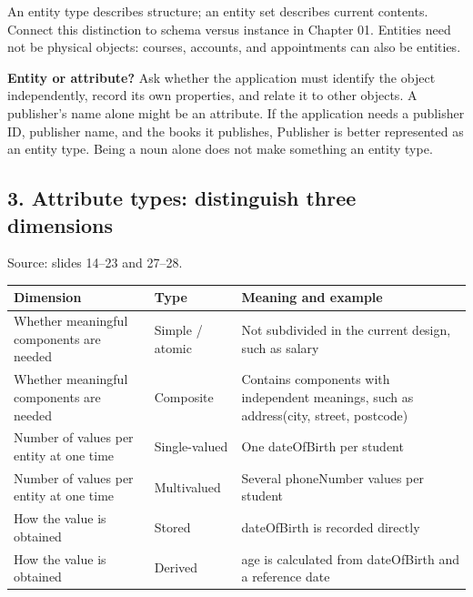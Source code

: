 An entity type describes structure; an entity set describes current contents. Connect this distinction to schema versus instance in Chapter 01. Entities need not be physical objects: courses, accounts, and appointments can also be entities.

\textbf{Entity or attribute?} Ask whether the application must identify the object independently, record its own properties, and relate it to other objects. A publisher's name alone might be an attribute. If the application needs a publisher ID, publisher name, and the books it publishes, Publisher is better represented as an entity type. Being a noun alone does not make something an entity type.

\subsection{3. Attribute types: distinguish three dimensions}\label{02_er_modelling_en-attribute-types-distinguish-three-dimensions}

Source: slides 14--23 and 27--28.

\begin{longtable}[]{@{}
  >{\raggedright\arraybackslash}p{}
  >{\raggedright\arraybackslash}p{}
  >{\raggedright\arraybackslash}p{}@{}}
\toprule\noalign{}
\begin{minipage}[b]{\linewidth}\raggedright
Dimension
\end{minipage} & \begin{minipage}[b]{\linewidth}\raggedright
Type
\end{minipage} & \begin{minipage}[b]{\linewidth}\raggedright
Meaning and example
\end{minipage} \\
\midrule\noalign{}
\endhead
\bottomrule\noalign{}
\endlastfoot
Whether meaningful components are needed & Simple / atomic & Not subdivided in the current design, such as salary \\
Whether meaningful components are needed & Composite & Contains components with independent meanings, such as address(city, street, postcode) \\
Number of values per entity at one time & Single-valued & One dateOfBirth per student \\
Number of values per entity at one time & Multivalued & Several phoneNumber values per student \\
How the value is obtained & Stored & dateOfBirth is recorded directly \\
How the value is obtained & Derived & age is calculated from dateOfBirth and a reference date \\
\end{longtable}

